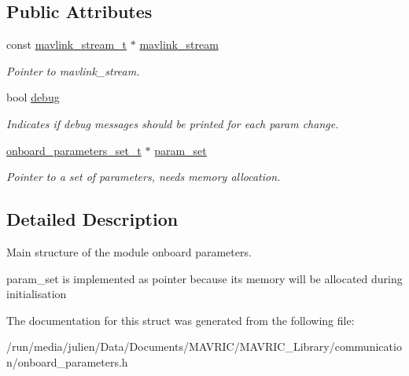 \subsection*{Public Attributes}
\begin{DoxyCompactItemize}
\item 
\hypertarget{structonboard__parameters__t_af36f799c663ab7579a52b457b372a811}{const \hyperlink{structmavlink__stream__t}{mavlink\+\_\+stream\+\_\+t} $\ast$ \hyperlink{structonboard__parameters__t_af36f799c663ab7579a52b457b372a811}{mavlink\+\_\+stream}}\label{structonboard__parameters__t_af36f799c663ab7579a52b457b372a811}

\begin{DoxyCompactList}\small\item\em Pointer to mavlink\+\_\+stream. \end{DoxyCompactList}\item 
\hypertarget{structonboard__parameters__t_a85152a217995ac175adfc3743ded5c3a}{bool \hyperlink{structonboard__parameters__t_a85152a217995ac175adfc3743ded5c3a}{debug}}\label{structonboard__parameters__t_a85152a217995ac175adfc3743ded5c3a}

\begin{DoxyCompactList}\small\item\em Indicates if debug messages should be printed for each param change. \end{DoxyCompactList}\item 
\hypertarget{structonboard__parameters__t_a84d0bbb56cdb747912da93ec41941484}{\hyperlink{structonboard__parameters__set__t}{onboard\+\_\+parameters\+\_\+set\+\_\+t} $\ast$ \hyperlink{structonboard__parameters__t_a84d0bbb56cdb747912da93ec41941484}{param\+\_\+set}}\label{structonboard__parameters__t_a84d0bbb56cdb747912da93ec41941484}

\begin{DoxyCompactList}\small\item\em Pointer to a set of parameters, needs memory allocation. \end{DoxyCompactList}\end{DoxyCompactItemize}


\subsection{Detailed Description}
Main structure of the module onboard parameters. 

param\+\_\+set is implemented as pointer because its memory will be allocated during initialisation 

The documentation for this struct was generated from the following file\+:\begin{DoxyCompactItemize}
\item 
/run/media/julien/\+Data/\+Documents/\+M\+A\+V\+R\+I\+C/\+M\+A\+V\+R\+I\+C\+\_\+\+Library/communication/onboard\+\_\+parameters.\+h\end{DoxyCompactItemize}
